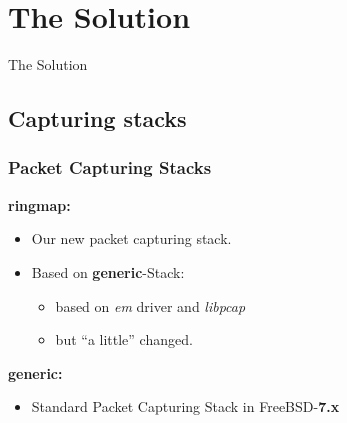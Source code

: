 \documentclass{beamer}
\begin{document}
\begin{frame}
\begin{columns}
\begin{figure}
\end{figure}
\end{columns}
\end{frame}



\section{The Solution}

\begin{frame}
	\begin{center}
	\huge{The Solution}
	\end{center}
\end{frame}


\subsection*{Capturing stacks}
\begin{frame}
\frametitle{Packet Capturing Stacks}
\textbf{ringmap:}
\begin{itemize}
	\item Our new packet capturing stack.
	\item Based on \textbf{generic}-Stack: 		
		\begin{itemize}
			\item based on \emph{em} driver and \emph{libpcap}
			\item but "`a little"' changed.\newline
		\end{itemize}
\end{itemize}
\textbf{generic:}
\begin{itemize}
	\item Standard Packet Capturing Stack in FreeBSD-\textbf{7.x}\newline \newline
\end{itemize}
\begin{center}
\end{center}
\end{frame}
\end{document}
